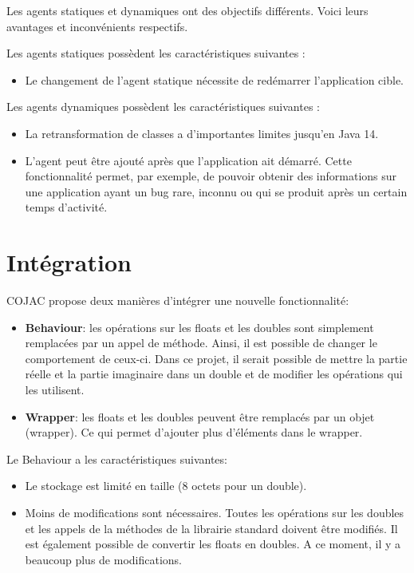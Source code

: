 Les agents statiques et dynamiques ont des objectifs différents. Voici leurs avantages et inconvénients respectifs.

Les agents statiques possèdent les caractéristiques suivantes :
\begin{itemize}
    \item Le changement de l'agent statique nécessite de redémarrer l'application cible.
\end{itemize}

Les agents dynamiques possèdent les caractéristiques suivantes :
\begin{itemize}
    \item La retransformation de classes a d'importantes limites jusqu'en Java 14.
    \item L'agent peut être ajouté après que l'application ait démarré. Cette fonctionnalité permet, par exemple, de pouvoir obtenir des informations sur une application ayant un bug rare, inconnu ou qui se produit après un certain temps d'activité.
\end{itemize}

\section{Intégration}

COJAC \cite{COJAC} propose deux manières d'intégrer une nouvelle fonctionnalité:
\begin{itemize}
    \item \textbf{Behaviour}: les opérations sur les floats et les doubles sont simplement remplacées par un appel de méthode. Ainsi, il est possible de changer le comportement de ceux-ci. Dans ce projet, il serait possible de mettre la partie réelle et la partie imaginaire dans un double et de modifier les opérations qui les utilisent.
    \item \textbf{Wrapper}: les floats et les doubles peuvent être remplacés par un objet (wrapper). Ce qui permet d'ajouter plus d'éléments dans le wrapper.
\end{itemize}

Le Behaviour a les caractéristiques suivantes:
\begin{itemize}
    \item Le stockage est limité en taille (8 octets pour un double).
    \item Moins de modifications sont nécessaires. Toutes les opérations sur les doubles et les appels de la méthodes de la librairie standard doivent être modifiés. Il est également possible de convertir les floats en doubles. A ce moment, il y a beaucoup plus de modifications.
\end{itemize}

